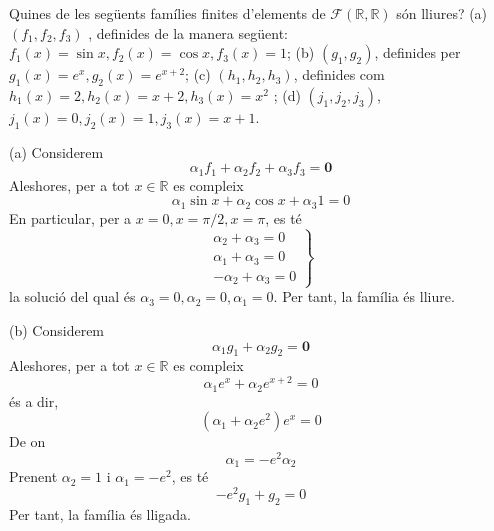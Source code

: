 \begin{exercici}
Quines de les següents famílies finites d’elements
de $\mathcal{F}(\mathbb{R},\mathbb{R})$ són lliures? (a) $(f_{1},f_{2},f_{3})$%
, definides de la manera següent: $f_{1}(x)=\sin x,f_{2}(x)=\cos x,f_{3}(x)=1$; (b) $%
(g_{1},g_{2})$, definides per $g_{1}(x)=e^{x},g_{2}(x)=e^{x+2}$; (c) $%
(h_{1},h_{2},h_{3})$, definides com $h_{1}(x)=2,h_{2}(x)=x+2,h_{3}(x)=x^{2}$%
; (d) $(j_{1},j_{2},j_{3})$, $j_{1}(x)=0,j_{2}(x)=1,j_{3}(x)=x+1$.

\end{exercici}
\begin{solucio}
(a) Considerem%
\begin{equation*}
\alpha _{1}f_{1}+\alpha _{2}f_{2}+\alpha _{3}f_{3}=\mathbf{0}
\end{equation*}%
Aleshores, per a tot $x\in \mathbb{R}$ es compleix%
\begin{equation*}
\alpha _{1}\sin x+\alpha _{2}\cos x+\alpha _{3}1=0
\end{equation*}%
En particular, per a $x=0,x=\pi /2,x=\pi $, es té%
\begin{equation*}
\left.
\begin{array}{r}
\alpha _{2}+\alpha _{3}=0 \\
\alpha _{1}+\alpha _{3}=0 \\
-\alpha _{2}+\alpha _{3}=0%
\end{array}%
\right\}
\end{equation*}%
la solució del qual és $\alpha _{3}=0,\alpha _{2}=0,\alpha _{1}=0$. Per tant,
la família és lliure.

(b) Considerem%
\begin{equation*}
\alpha _{1}g_{1}+\alpha _{2}g_{2}=\mathbf{0}
\end{equation*}%
Aleshores, per a tot $x\in \mathbb{R}$ es compleix%
\begin{equation*}
\alpha _{1}e^{x}+\alpha _{2}e^{x+2}=0
\end{equation*}%
és a dir,%
\begin{equation*}
(\alpha _{1}+\alpha _{2}e^{2})e^{x}=0
\end{equation*}%
De on%
\begin{equation*}
\alpha _{1}=-e^{2}\alpha _{2}
\end{equation*}%
Prenent $\alpha _{2}=1$ i $\alpha _{1}=-e^{2}$, es té%
\begin{equation*}
-e^{2}g_{1}+g_{2}=0
\end{equation*}%
Per tant, la família és lligada.


\end{solucio}
